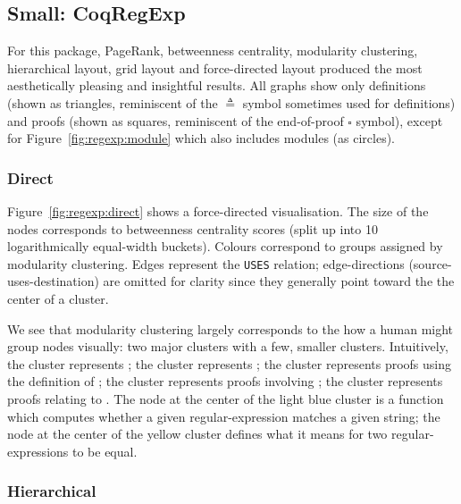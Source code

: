 \subsection{Small: CoqRegExp}

For this package, PageRank, betweenness centrality, modularity clustering,
hierarchical layout, grid layout and force-directed layout produced the most
aesthetically pleasing and insightful results. All graphs show only definitions
(shown as triangles, reminiscent of the $\triangleq$ symbol sometimes used for
definitions) and proofs (shown as squares, reminiscent of the end-of-proof
$\square$ symbol), except for Figure~\ref{fig:regexp:module} which also includes
modules (as circles).

\subsubsection{Direct}

Figure~\ref{fig:regexp:direct} shows a force-directed visualisation. The size of
the nodes corresponds to betweenness centrality scores (split up into 10
logarithmically equal-width buckets). Colours correspond to groups assigned by modularity
clustering. Edges represent the \texttt{USES} relation; edge-directions
(source-uses-destination) are omitted for clarity since they generally point
toward the the center of a cluster.

We see that modularity clustering largely corresponds to the how a human might
group nodes visually: two major clusters with a few, smaller clusters.
Intuitively, the  cluster represents ; the  cluster represents ; the  cluster represents proofs using the
definition of ; the  cluster
represents proofs involving ;
the  cluster represents proofs relating to . The node at the center of the light blue cluster is a function which
computes whether a given regular-expression matches a given string; the node at
the center of the yellow cluster defines what it means for two
regular-expressions to be equal.

\subsubsection{Hierarchical}

